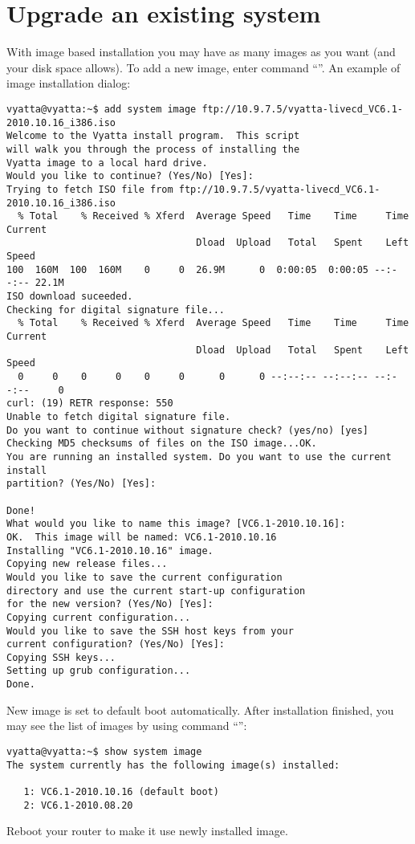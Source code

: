 \section{Upgrade an existing system}
\solution
With image based installation you may have as many images as you want (and your disk space allows). To add a new
image, enter command ``''. An example of image installation dialog:
\begin{verbatim}
vyatta@vyatta:~$ add system image ftp://10.9.7.5/vyatta-livecd_VC6.1-2010.10.16_i386.iso
Welcome to the Vyatta install program.  This script
will walk you through the process of installing the
Vyatta image to a local hard drive.
Would you like to continue? (Yes/No) [Yes]: 
Trying to fetch ISO file from ftp://10.9.7.5/vyatta-livecd_VC6.1-2010.10.16_i386.iso
  % Total    % Received % Xferd  Average Speed   Time    Time     Time  Current
                                 Dload  Upload   Total   Spent    Left  Speed
100  160M  100  160M    0     0  26.9M      0  0:00:05  0:00:05 --:--:-- 22.1M
ISO download suceeded.
Checking for digital signature file...
  % Total    % Received % Xferd  Average Speed   Time    Time     Time  Current
                                 Dload  Upload   Total   Spent    Left  Speed
  0     0    0     0    0     0      0      0 --:--:-- --:--:-- --:--:--     0
curl: (19) RETR response: 550
Unable to fetch digital signature file.
Do you want to continue without signature check? (yes/no) [yes] 
Checking MD5 checksums of files on the ISO image...OK.
You are running an installed system. Do you want to use the current install
partition? (Yes/No) [Yes]: 

Done!
What would you like to name this image? [VC6.1-2010.10.16]: 
OK.  This image will be named: VC6.1-2010.10.16
Installing "VC6.1-2010.10.16" image.
Copying new release files...
Would you like to save the current configuration 
directory and use the current start-up configuration 
for the new version? (Yes/No) [Yes]: 
Copying current configuration...
Would you like to save the SSH host keys from your 
current configuration? (Yes/No) [Yes]: 
Copying SSH keys...
Setting up grub configuration...
Done.
\end{verbatim}
New image is set to default boot automatically. After installation finished, you may see the list of images
by using command ``'':
\begin{verbatim}
vyatta@vyatta:~$ show system image 
The system currently has the following image(s) installed:

   1: VC6.1-2010.10.16 (default boot)
   2: VC6.1-2010.08.20
\end{verbatim}
Reboot your router to make it use newly installed image.


